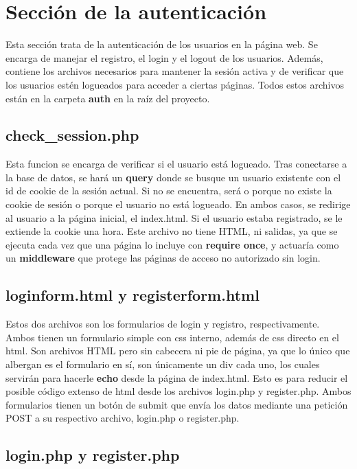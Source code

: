 \documentclass[a4paper, 12pt]{report}
\begin{document}
    \chapter{Sección de la autenticación}

    Esta sección trata de la autenticación de los usuarios en la página web. Se encarga de manejar el registro, el
    login y el logout de los usuarios. Además, contiene los archivos necesarios para mantener la sesión activa y de
    verificar que los usuarios estén logueados para acceder a ciertas páginas. Todos estos archivos están en la
    carpeta \textbf{auth} en la raíz del proyecto.

    \section{check\_session.php}

    Esta funcion se encarga de verificar si el usuario está logueado. Tras conectarse a la base de datos, se hará un
    \textbf{query} donde se busque un usuario existente con el id de cookie de la sesión actual. Si no se encuentra,
    será o porque no
    existe la cookie de sesión o porque el usuario no está logueado. En ambos casos, se redirige al usuario a la
    página inicial, el index.html. Si el usuario estaba registrado, se le extiende la cookie una hora. Este archivo
    no tiene HTML, ni salidas, ya que se ejecuta cada vez que una página lo incluye con \textbf{require once}, y
    actuaría como un \textbf{middleware} que protege las páginas de acceso no autorizado sin login.

    \section{loginform.html y registerform.html}

    Estos dos archivos son los formularios de login y registro, respectivamente. Ambos tienen un formulario simple
    con css interno, además de css directo en el html. Son archivos HTML pero sin cabecera ni pie de página, ya que
    lo único que albergan es el formulario en sí, son únicamente un div cada uno, los cuales servirán para hacerle
    \textbf{echo} desde la página de index.html. Esto es para reducir el posible código extenso de html desde los
    archivos login.php y register.php. Ambos formularios tienen un botón de submit que envía los datos mediante una
    petición POST a su respectivo archivo, login.php o register.php.

    \section{login.php y register.php}
\end{document}
